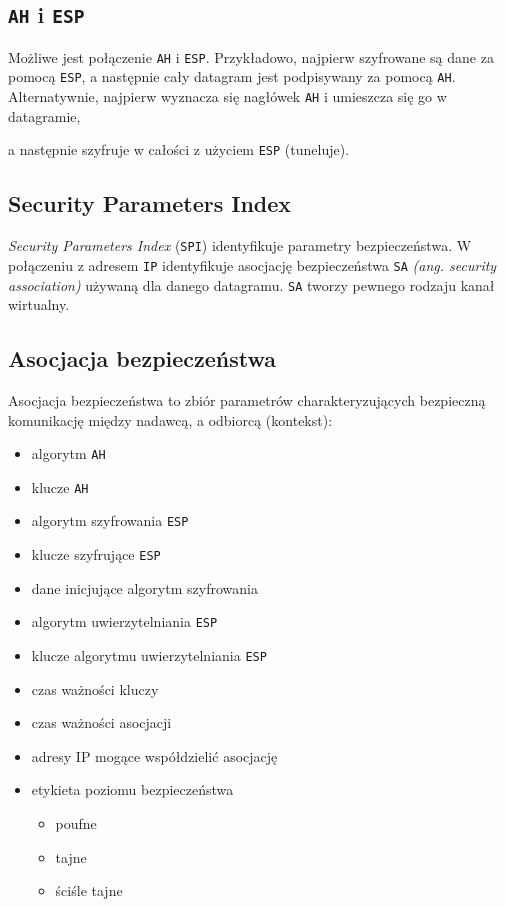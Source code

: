 \documentclass{article}
\begin{document}
\subsection{{\tt AH} i {\tt ESP}}

Możliwe jest połączenie {\tt AH} i {\tt ESP}. Przykładowo, najpierw szyfrowane są dane za pomocą {\tt ESP},
a następnie cały datagram jest podpisywany za pomocą {\tt AH}. Alternatywnie, najpierw wyznacza się nagłówek {\tt AH} i umieszcza się go w datagramie,

a następnie szyfruje w całości z użyciem {\tt ESP} (tuneluje).

\subsection{Security Parameters Index}

\emph{Security Parameters Index} ({\tt SPI}) identyfikuje parametry bezpieczeństwa.
W połączeniu z adresem {\tt IP} identyfikuje asocjację bezpieczeństwa {\tt SA} \emph{(ang. security association)} używaną dla danego datagramu.
{\tt SA} tworzy pewnego rodzaju kanał wirtualny.

\subsection{Asocjacja bezpieczeństwa}

Asocjacja bezpieczeństwa to zbiór parametrów charakteryzujących bezpieczną komunikację między nadawcą, a odbiorcą (kontekst):

\begin{itemize}
  \item algorytm {\tt AH}
  \item klucze {\tt AH}
  \item algorytm szyfrowania {\tt ESP}
  \item klucze szyfrujące {\tt ESP}
  \item dane inicjujące algorytm szyfrowania
  \item algorytm uwierzytelniania {\tt ESP}
  \item klucze algorytmu uwierzytelniania {\tt ESP}
  \item czas ważności kluczy
  \item czas ważności asocjacji
  \item adresy IP mogące współdzielić asocjację
  \item etykieta poziomu bezpieczeństwa
  \begin{itemize}
    \item poufne
    \item tajne
    \item ściśle tajne
  \end{itemize}
\end{itemize}
\end{document}
